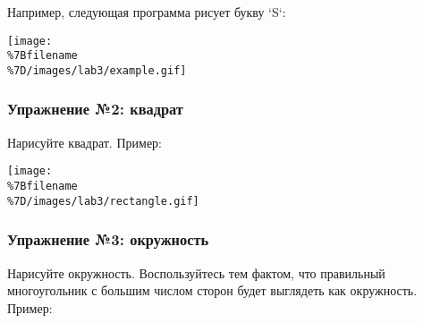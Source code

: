 Например, следующая программа рисует букву `S`:

\begin{Shaded}
\begin{Highlighting}[]
 

\NormalTok{)}
\NormalTok{)}
\NormalTok{)}
\NormalTok{)}
\NormalTok{)}
\NormalTok{)}
\NormalTok{)}
\NormalTok{)}
\NormalTok{)}
\NormalTok{)}
\end{Highlighting}
\end{Shaded}

\texttt{[image: \\\%7Bfilename\\\%7D/images/lab3/example.gif]}

\subsubsection{Упражнение №2:
квадрат}\label{ux443ux43fux440ux430ux436ux43dux435ux43dux438ux435-2-ux43aux432ux430ux434ux440ux430ux442}

Нарисуйте квадрат. Пример:

\texttt{[image: \\\%7Bfilename\\\%7D/images/lab3/rectangle.gif]}

\begin{Shaded}
\begin{Highlighting}[]
 

  \NormalTok{(}\NormalTok{):}
    \NormalTok{)}
    \NormalTok{)}
\end{Highlighting}
\end{Shaded}

\subsubsection{Упражнение №3:
окружность}\label{ux443ux43fux440ux430ux436ux43dux435ux43dux438ux435-3-ux43eux43aux440ux443ux436ux43dux43eux441ux442ux44c}

Нарисуйте окружность. Воспользуйтесь тем фактом, что правильный
многоугольник с большим числом сторон будет выглядеть как окружность.
Пример:

